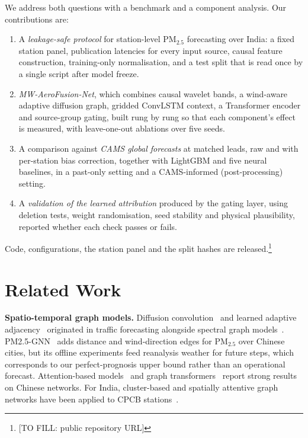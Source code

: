 \documentclass[conference]{IEEEtran}
\newcommand{\blank}[1]{{\color{red!75!black}\sffamily\footnotesize[TO FILL: #1]}}
\begin{document}
We address both questions with a benchmark and a component analysis. Our contributions are:
\begin{enumerate}
\item A \emph{leakage-safe protocol} for station-level PM$_{2.5}$ forecasting over India: a fixed station panel,
publication latencies for every input source, causal feature construction, training-only normalisation, and a test
split that is read once by a single script after model freeze.
\item \emph{MW-AeroFusion-Net}, which combines causal wavelet bands, a wind-aware adaptive diffusion graph, gridded
ConvLSTM context, a Transformer encoder and source-group gating, built rung by rung so that each component's effect
is measured, with leave-one-out ablations over five seeds.
\item A comparison against \emph{CAMS global forecasts} at matched leads, raw and with per-station bias correction,
together with LightGBM and five neural baselines, in a past-only setting and a CAMS-informed (post-processing) setting.
\item A \emph{validation of the learned attribution} produced by the gating layer, using deletion tests, weight
randomisation, seed stability and physical plausibility, reported whether each check passes or fails.
\end{enumerate}
Code, configurations, the station panel and the split hashes are released.\footnote{\blank{public repository URL}}

\section{Related Work}
\textbf{Spatio-temporal graph models.} Diffusion convolution~\cite{li2017diffusion} and learned adaptive
adjacency~\cite{Wu_2019} originated in traffic forecasting alongside spectral graph models~\cite{Yu_2018,kipf2016semisupervised}.
PM2.5-GNN~\cite{Wang_2020} adds distance and wind-direction edges for PM$_{2.5}$ over Chinese cities, but its offline
experiments feed reanalysis weather for future steps, which corresponds to our perfect-prognosis upper bound rather than an
operational forecast. Attention-based models~\cite{Liang_2018,Liang_2023,Yi_2018} and graph transformers~\cite{Zhang_2022,Lu_2025}
report strong results on Chinese networks. For India, cluster-based and spatially attentive graph networks have been
applied to CPCB stations~\cite{Ejurothu_2022,Mandal_2023}.
\end{document}
